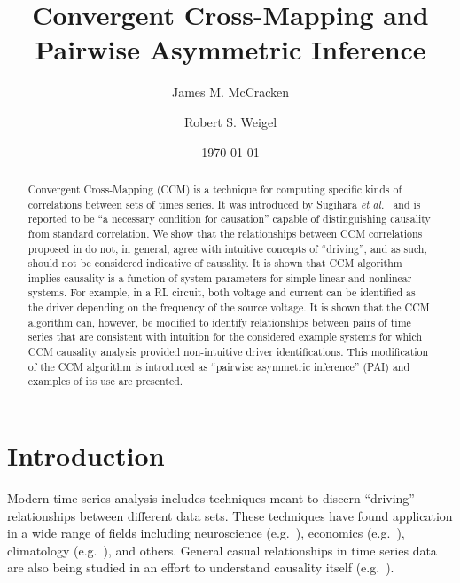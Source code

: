 \documentclass[twocolumn,aps,pre,groupedaddress]{revtex4-1}
\begin{document}
\title{Convergent Cross-Mapping and Pairwise Asymmetric Inference}
\author{James M. McCracken}
\author{Robert S. Weigel}
\date{\today}

\begin{abstract}
Convergent Cross-Mapping (CCM) is a technique for computing specific kinds of correlations between sets of times series.  It was introduced by Sugihara {\em et al.\ }\cite{Sugihara2012} and is reported to be ``a necessary condition for causation'' capable of distinguishing causality from standard correlation.  We show that the relationships between CCM correlations proposed in \cite{Sugihara2012} do not, in general, agree with intuitive concepts of ``driving'', and as such, should not be considered indicative of causality.  It is shown that CCM algorithm implies causality is a function of system parameters for simple linear and nonlinear systems.  For example, in a RL circuit, both voltage and current can be identified as the driver depending on the frequency of the source voltage.  It is shown that the CCM algorithm can, however, be modified to identify relationships between pairs of time series that are consistent with intuition for the considered example systems for which CCM causality analysis provided non-intuitive driver identifications.  This modification of the CCM algorithm is introduced as ``pairwise asymmetric inference'' (PAI) and examples of its use are presented.  
\end{abstract}

\pacs{}
\maketitle

\section{Introduction}
Modern time series analysis includes techniques meant to discern ``driving'' relationships between different data sets.  These techniques have found application in a wide range of fields including neuroscience (e.g.\ \cite{Kaminski2001}), economics (e.g.\ \cite{dufour1998,dufour2006}), climatology (e.g.\ \cite{mosedale2006}), and others.  General casual relationships in time series data are also being studied in an effort to understand causality itself (e.g.\ \cite{eichler2012}).  
\end{document}
